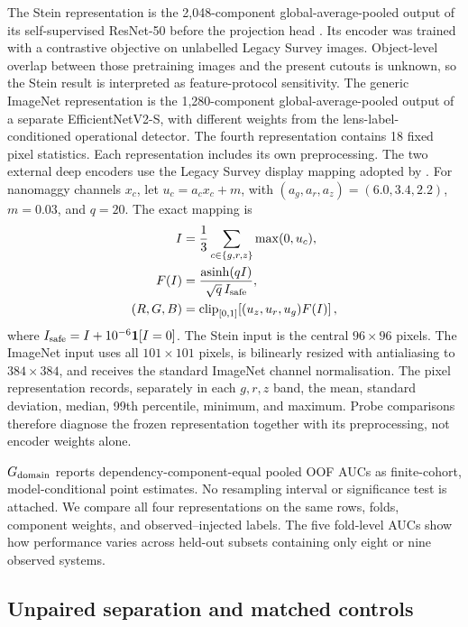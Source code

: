 The Stein representation is the 2,048-component global-average-pooled output
of its self-supervised ResNet-50 before the projection head
\citep{Stein2022}. Its encoder was trained with a contrastive objective on
unlabelled Legacy Survey images. Object-level overlap between those
pretraining images and the present cutouts is unknown, so the Stein result is
interpreted as feature-protocol sensitivity. The generic ImageNet
representation is the 1,280-component global-average-pooled output of a
separate EfficientNetV2-S, with different weights from the lens-label-conditioned
operational detector. The fourth representation contains 18 fixed pixel
statistics. Each representation includes its own preprocessing. The two
external deep encoders use the Legacy Survey display mapping adopted by
\citet{Stein2022}. For nanomaggy
channels \(x_c\), let \(u_c=a_cx_c+m\), with
\((a_g,a_r,a_z)=(6.0,3.4,2.2)\), \(m=0.03\), and \(q=20\). The exact mapping is
\begin{equation}
\begin{aligned}
 I&={1\over3}\sum_{c\in\{g,r,z\}}\max(0,u_c),\\
 F(I)&={\operatorname{asinh}(qI)\over\sqrt q\,I_{\rm safe}},\\
 (R,G,B)&=\operatorname{clip}_{[0,1]}\!\left[(u_z,u_r,u_g)F(I)\right],
\end{aligned}
\label{eq:rgb_preprocessing}
\end{equation}
where \(I_{\rm safe}=I+10^{-6}\mathbf{1}[I=0]\). The Stein input is
the central \(96\times96\) pixels. The ImageNet input uses all
\(101\times101\) pixels, is bilinearly resized with antialiasing to
\(384\times384\), and receives the standard ImageNet channel normalisation.
The pixel representation records, separately in each \(g,r,z\) band, the
mean, standard deviation, median, 99th percentile, minimum, and maximum.
Probe comparisons therefore diagnose the frozen representation together with
its preprocessing, not encoder weights alone.

\(G_{\rm domain}\) reports dependency-component-equal pooled OOF AUCs as
finite-cohort, model-conditional point estimates. No resampling interval or
significance test is attached. We compare all four representations on the
same rows, folds, component weights, and observed--injected labels. The five
fold-level AUCs show how performance varies across held-out subsets containing
only eight or nine observed systems.

\subsection{Unpaired separation and matched controls}
\label{sec:decomposition_methods}

